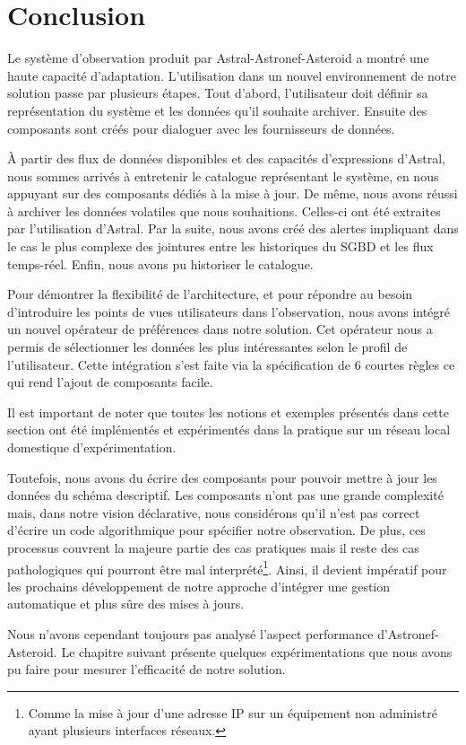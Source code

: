 \section{Conclusion}\label{sec:valid:domvision:conclusion}
Le système d'observation produit par Astral-Astronef-Asteroid a montré une haute capacité d'adaptation. L'utilisation dans un nouvel environnement de notre solution passe par plusieurs étapes. Tout d'abord, l'utilisateur doit définir sa représentation du système et les données qu'il souhaite archiver. Ensuite des composants sont créés pour dialoguer avec les fournisseurs de données. 

À partir des flux de données disponibles et des capacités d'expressions d'Astral, nous sommes arrivés à entretenir le catalogue représentant le système, en nous appuyant sur des composants dédiés à la mise à jour. De même, nous avons réussi à archiver les données volatiles que nous souhaitions. Celles-ci ont été extraites par l'utilisation d'Astral. Par la suite, nous avons créé des alertes impliquant dans le cas le plus complexe des jointures entre les historiques du SGBD et les flux temps-réel. Enfin, nous avons pu historiser le catalogue.

Pour démontrer la flexibilité de l'architecture, et pour répondre au besoin d'introduire les points de vues utilisateurs dans l'observation, nous avons intégré un nouvel opérateur de préférences dans notre solution. Cet opérateur nous a permis de sélectionner les données les plus intéressantes selon le profil de l'utilisateur. Cette intégration s'est faite via la spécification de 6 courtes règles ce qui rend l'ajout de composants facile.

Il est important de noter que toutes les notions et exemples présentés dans cette section ont été implémentés et expérimentés dans la pratique sur un réseau local domestique d'expérimentation.

Toutefois, nous avons du écrire des composants pour pouvoir mettre à jour les données du schéma descriptif. Les composants n'ont pas une grande complexité mais, dans notre vision déclarative, nous considérons qu'il n'est pas correct d'écrire un code algorithmique pour spécifier notre observation. De plus, ces processus couvrent la majeure partie des cas pratiques mais il reste des cas pathologiques qui pourront être mal interprété\footnote{Comme la mise à jour d'une adresse IP sur un équipement non administré ayant plusieurs interfaces réseaux.}. Ainsi, il devient impératif pour les prochains développement de notre approche d'intégrer une gestion automatique et plus sûre des mises à jours.

Nous n'avons cependant toujours pas analysé l'aspect performance d'Astronef-Asteroid. Le chapitre suivant présente quelques expérimentations que nous avons pu faire pour mesurer l'efficacité de notre solution.